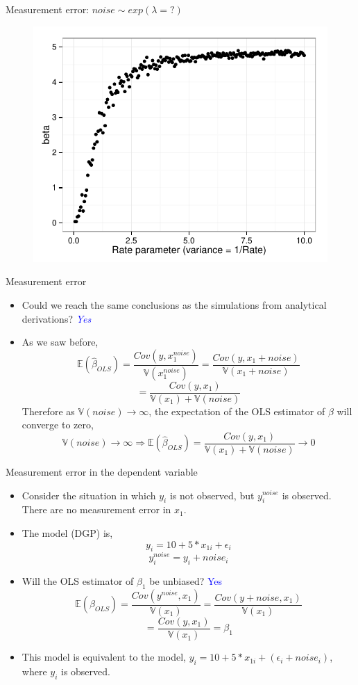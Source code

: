 \documentclass[handout]{beamer}
\begin{document}
\begin{frame}{Measurement error: $noise \sim exp(\lambda = ?)$}
\begin{figure}
\includegraphics[scale=0.8]{ols5.pdf}
\end{figure}
\end{frame}

\begin{frame}{Measurement error}
\begin{itemize}
\item Could we reach the same conclusions as the simulations from analytical derivations?\pause
\textcolor{blue}{\textit{Yes}}
\item As we saw before,
$$ \mathbb{E}(\hat{\beta}_{OLS}) = \frac{Cov(y,x_1^{noise})}{\mathbb{V}(x_1^{noise})} 
 = \frac{Cov(y,x_1+noise)}{\mathbb{V}(x_1+noise)}$$
 $$ = \frac{Cov(y,x_1)}{\mathbb{V}(x_1)+\mathbb{V}(noise)}$$
 \pause
 Therefore as $\mathbb{V}(noise)\rightarrow \infty$, the expectation of the OLS estimator of $\beta$ will converge to zero,
 $$\mathbb{V}(noise)\rightarrow \infty \Rightarrow \mathbb{E}(\hat{\beta}_{OLS}) = \frac{Cov(y,x_1)}{\mathbb{V}(x_1)+\mathbb{V}(noise)} \rightarrow 0$$
\end{itemize}
\end{frame}

\begin{frame}[fragile]{Measurement error in the dependent variable}
\begin{itemize}
\item Consider the situation in which $y_i$ is not observed, but $y_i^{noise}$ is observed. There are no measurement error in $x_1$. 
\item The model (DGP) is,
\[ y_i = 10+5*x_{1i}+\epsilon_i \]
\[ y_i^{noise} = y_i+noise_i \]
\item Will the OLS estimator of $\beta_1$ be unbiased? \pause \textcolor{blue}{Yes}
\[
\mathbb{E}(\hat{\beta}_{OLS}) = \frac{Cov(y^{noise},x_1)}{\mathbb{V}(x_1)} 
 = \frac{Cov(y+noise,x_1)}{\mathbb{V}(x_1)}\] 
\[ = \frac{Cov(y,x_1)}{\mathbb{V}(x_1)} = \beta_1
\]
\item This model is equivalent to the model, $y_i = 10+5*x_{1i}+(\epsilon_i+noise_i) $, where $y_i$ is observed. 
\end{itemize}
\end{frame}
\end{document}
